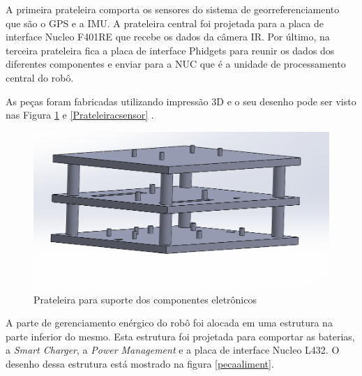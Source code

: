 \begin{itemize}
	A primeira prateleira comporta os sensores do sistema de georreferenciamento que são o GPS e a IMU. A prateleira central foi projetada para a placa de interface Nucleo F401RE que recebe os dados da câmera IR. Por último, na terceira prateleira fica a placa de interface Phidgets para reunir os dados dos diferentes componentes e enviar para a NUC que é a  unidade de processamento central do robô.
	
	As peças foram fabricadas utilizando impressão 3D e o seu desenho pode ser visto nas Figura \ref{Prateleira} e \ref{Prateleiracsensor} .
	
	\begin{figure}[h]
		\centering
		\includegraphics[width=14cm]{Figures/prateleira.png}
		\caption{Prateleira para suporte dos componentes eletrônicos} \label{Prateleira}
	\end{figure}
	
	
	
	A parte de gerenciamento enérgico do robô foi alocada em uma estrutura na parte inferior do mesmo. Esta estrutura foi projetada para comportar as baterias, a \textit{Smart Charger}, a \textit{Power Management} e a placa de interface Nucleo L432. O desenho dessa estrutura está mostrado na figura \ref{pecaaliment}.
	

\end{itemize}
